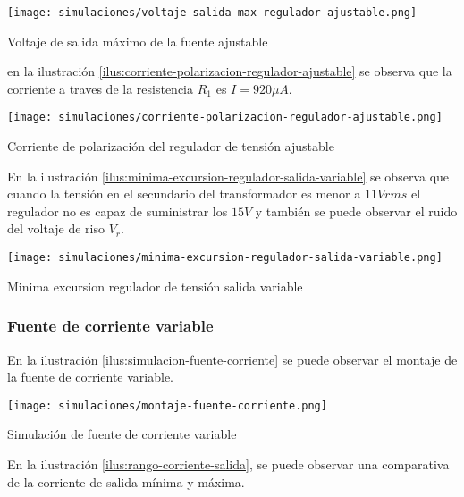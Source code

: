 \begin{ilustracion}[ht]
    \centering
    \texttt{[image: simulaciones/voltaje-salida-max-regulador-ajustable.png]}
    \caption{Voltaje de salida máximo de la fuente ajustable}
    \label{ilus:voltaje-salida-max-regulador-ajustable}
\end{ilustracion}

en la ilustración \ref{ilus:corriente-polarizacion-regulador-ajustable} se observa que la corriente a traves de la resistencia $R_1$ es $I = 920 \mu A$.

\begin{ilustracion}
    \centering
    \texttt{[image: simulaciones/corriente-polarizacion-regulador-ajustable.png]}
    \caption{Corriente de polarización del regulador de tensión ajustable}
    \label{ilus:corriente-polarizacion-regulador-ajustable}
\end{ilustracion}

En la ilustración \ref{ilus:minima-excursion-regulador-salida-variable} se observa que cuando la tensión en el secundario del transformador es menor a $11 Vrms$ el regulador no es capaz de suministrar los $15V$ y también se puede observar el ruido del voltaje de riso $V_r$.

\begin{ilustracion}
    \centering
    \texttt{[image: simulaciones/minima-excursion-regulador-salida-variable.png]}
    \caption{Minima excursion regulador de tensión salida variable}
    \label{ilus:minima-excursion-regulador-salida-variable}
\end{ilustracion}

\FloatBarrier
\subsubsection*{Fuente de corriente variable}

En la ilustración \ref{ilus:simulacion-fuente-corriente} se puede observar el montaje de la fuente de corriente variable.

\begin{ilustracion}[ht]
    \centering
    \texttt{[image: simulaciones/montaje-fuente-corriente.png]}
    \caption{Simulación de fuente de corriente variable}
    \label{ilus:simulacion-fuente-corriente}
\end{ilustracion}

En la ilustración \ref{ilus:rango-corriente-salida}, se puede observar una comparativa de la corriente de salida mínima y máxima.

